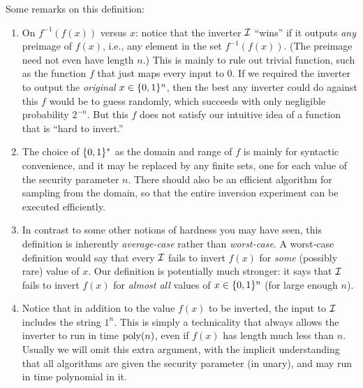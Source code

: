\documentclass[11pt]{article}
\begin{document}
\noindent Some remarks on this definition:

\begin{enumerate}
\item On $f^{-1}(f(x))$ versus $x$: notice that the inverter $\mathcal{I}$
  ``wins'' if it outputs \emph{any} preimage of $f(x)$, i.e., any
  element in the set $f^{-1}(f(x))$.  (The preimage need not even have
  length $n$.)  This is mainly to rule out trivial function, such as
  the function $f$ that just maps every input to $0$.  If we required
  the inverter to output the \emph{original} $x \in \{0,1\}^{n}$, then
  the best any inverter could do against this $f$ would be to guess
  randomly, which succeeds with only negligible probability $2^{-n}$.
  But this $f$ does not satisfy our intuitive idea of a function that
  is ``hard to invert.''
  
\item The choice of $\{0,1\}^{*}$ as the domain and range of $f$ is
  mainly for syntactic convenience, and it may be replaced by any
  finite sets, one for each value of the security parameter $n$.
  There should also be an efficient algorithm for sampling from the
  domain, so that the entire inversion experiment can be executed
  efficiently.

\item In contrast to some other notions of hardness you may have seen,
  this definition is inherently \emph{average-case} rather than
  \emph{worst-case}.  A worst-case definition would say that every
  $\mathcal{I}$ fails to invert $f(x)$ for \emph{some} (possibly rare) value
  of $x$.  Our definition is potentially much stronger: it says that
  $\mathcal{I}$ fails to invert $f(x)$ for \emph{almost all} values of $x \in
  \{0,1\}^{n}$ (for large enough $n$).\label{item:worst-average}
  
\item Notice that in addition to the value $f(x)$ to be inverted, the
  input to $\mathcal{I}$ includes the string $1^{n}$.  This is simply a
  technicality that always allows the inverter to run in time
  $\operatorname{poly}(n)$, even if $f(x)$ has length much less than $n$.  Usually
  we will omit this extra argument, with the implicit understanding
  that all algorithms are given the security parameter (in unary), and
  may run in time polynomial in it.
\end{enumerate}
\end{document}
